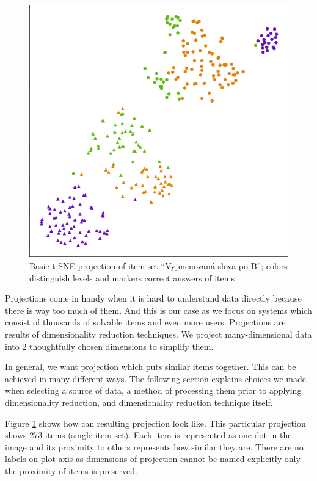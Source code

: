 \documentclass[
  digital, %
  table,   %
  nolof,     %
  nolot,     %
  nocover,
  color,
  final, %
]{fithesis3}
\begin{document}
\begin{figure}
    \includegraphics[width=\textwidth]{img/common_projection}
  \caption{Basic t-SNE projection of item-set ``Vyjmenovaná slova po B''; colors distinguish levels and markers correct answers of items}
  \label{fig:common_projection}
\end{figure}


Projections come in handy when it is hard to understand data directly because there is way too much of them. And this is our case as we focus on systems which consist of thousands of solvable items and even more users. Projections are results of dimensionality reduction techniques. We project many-dimensional data into 2 thoughtfully chosen dimensions to simplify them.


In general, we want projection which puts similar items together. This can be achieved in many different ways. The following section explains choices we made when selecting a source of data, a method of processing them prior to applying dimensionality reduction, and dimensionality reduction technique itself.


Figure \ref{fig:common_projection} shows how can resulting projection look like. This particular projection shows 273 items (single item-set). Each item is represented as one dot in the image and its proximity to others represents how similar they are. There are no labels on plot axis as dimensions of projection cannot be named explicitly only the proximity of items is preserved.
\end{document}
